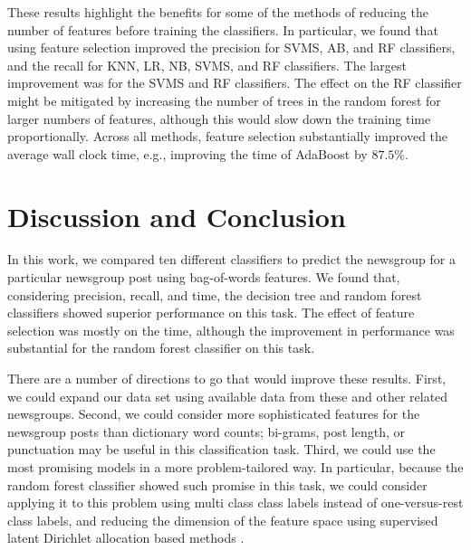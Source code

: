 \documentclass{article} %
\begin{document}
These results highlight the benefits for some of the methods of reducing the number of features before training the classifiers. In particular, we found that using feature selection improved the precision for SVMS, AB, and RF classifiers, and the recall for KNN, LR, NB, SVMS, and RF classifiers. The largest improvement was for the SVMS and RF classifiers. The effect on the RF classifier might be mitigated by increasing the number of trees in the random forest for larger numbers of features, although this would slow down the training time proportionally. Across all methods, feature selection substantially improved the average wall clock time, e.g., improving the time of AdaBoost by $87.5\%$.

\section{Discussion and Conclusion}

In this work, we compared ten different classifiers to predict the newsgroup for a particular newsgroup post using bag-of-words features. We found that, considering precision, recall, and time, the decision tree and random forest classifiers showed superior performance on this task.  The effect of feature selection was mostly on the time, although the improvement in performance was substantial for the random forest classifier on this task.

There are a number of directions to go that would improve these results. First, we could expand our data set using available data from these and other related newsgroups. Second, we could consider more sophisticated features for the newsgroup posts than dictionary word counts; bi-grams, post length, or punctuation may be useful in this classification task. Third, we could use the most promising models in a more problem-tailored way. In particular, because the random forest classifier showed such promise in this task, we could consider applying it to this problem using multi class class labels instead of one-versus-rest class labels, and reducing the dimension of the feature space using supervised latent Dirichlet allocation based methods \cite{zhu2009,lacoste2009}. 





\end{document}

